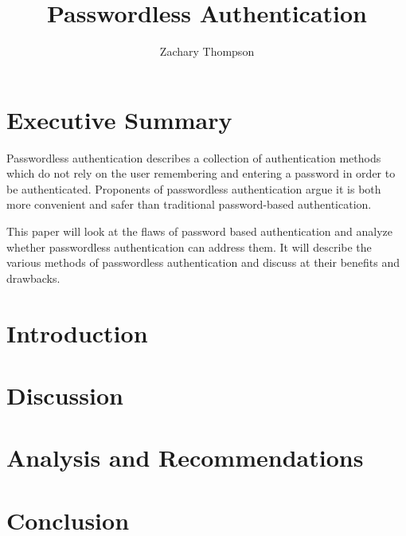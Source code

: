 \documentclass[12pt, letterpaper]{article}
\title{Passwordless Authentication}
\author{Zachary Thompson}
\begin{document}
\maketitle

\section{Executive Summary}
Passwordless authentication describes a collection of authentication methods which do not rely on the user remembering and entering a password in order to be authenticated.
Proponents of passwordless authentication argue it is both more convenient and safer than traditional password-based authentication.

This paper will look at the flaws of password based authentication and analyze whether passwordless authentication can address them.
It will describe the various methods of passwordless authentication and discuss at their benefits and drawbacks.
\section{Introduction}
\section{Discussion}
\section{Analysis and Recommendations}
\section{Conclusion}

\printbibliography
\end{document}
